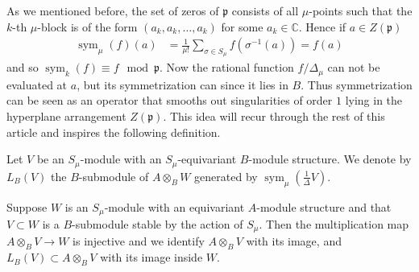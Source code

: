 \documentclass[11pt,fleqn]{article}
\newcommand\CC{\mathbb C}
\newcommand\ot{\otimes}
\renewcommand\to{\longrightarrow}
\newcommand\p{\mathfrak p}
\DeclareMathOperator\sym{sym}
\begin{document}
As we mentioned before, the set of zeros of $\p$ consists of all $\mu$-points 
such that the $k$-th $\mu$-block is of the form $(a_k, a_k, \ldots, a_k)$ for
some $a_k \in \CC$. Hence if $a \in Z(\p)$
\begin{align*}
\sym_\mu(f)(a) 
  &= \frac{1}{\mu!} \sum_{\sigma \in S_\mu} f(\sigma^{-1}(a)) 
  = f(a)
\end{align*}
and so $\sym_k(f) \equiv f\mod \p$. Now the rational function $f/\Delta_\mu$ 
can not be evaluated at $a$, but its symmetrization can since it lies in $B$. 
Thus symmetrization can be seen as an operator that smooths out singularities 
of order $1$ lying in the hyperplane arrangement $Z(\p)$. This idea will recur 
through the rest of this article and inspires the following definition.

\begin{Definition}
Let $V$ be an $S_\mu$-module with an $S_\mu$-equivariant $B$-module structure.
We denote by $L_B(V)$ the $B$-submodule of $A \ot_B W$ generated by 
$\sym_\mu\left(\frac{1}{\Delta} V \right)$.
\end{Definition}
Suppose $W$ is an $S_\mu$-module with an equivariant $A$-module structure
and that $V \subset W$ is a $B$-submodule stable by the action of $S_\mu$.
Then the multiplication map $A \ot_B V \to W$ is injective and we identify
$A \ot_B V$ with its image, and $L_B(V) \subset A \ot_B V$ with its image 
inside $W$. 
\end{document}
